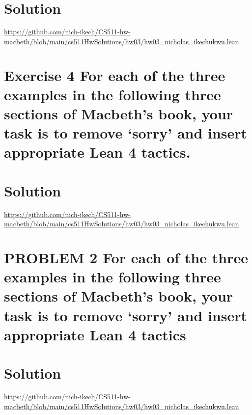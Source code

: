 \documentclass{article}
\begin{document}
\section*{Solution}
\url{https://github.com/nich-ikech/CS511-hw-macbeth/blob/main/cs511HwSolutions/hw03/hw03_nicholas_ikechukwu.lean}

\newpage

\section*{Exercise 4 For each of the three examples in the following three sections of Macbeth’s book, your
task is to remove ‘sorry’ and insert appropriate Lean 4 tactics.}
\section*{Solution}

\url{https://github.com/nich-ikech/CS511-hw-macbeth/blob/main/cs511HwSolutions/hw03/hw03_nicholas_ikechukwu.lean}

\newpage

\section*{PROBLEM 2 For each of the three examples in the following three sections of Macbeth’s book,
your task is to remove ‘sorry’ and insert appropriate Lean 4 tactics}
\section*{Solution}

\url{https://github.com/nich-ikech/CS511-hw-macbeth/blob/main/cs511HwSolutions/hw03/hw03_nicholas_ikechukwu.lean}
\end{document}
